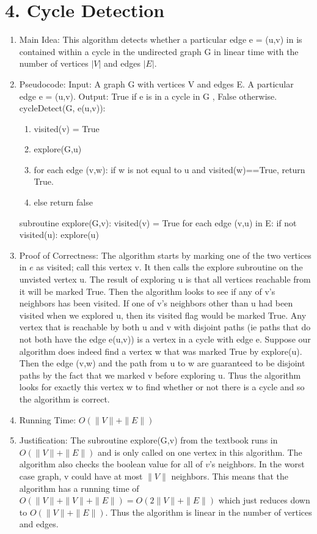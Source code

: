\documentclass[11pt]{article}
\begin{document}
\section*{4. Cycle Detection}
\begin{enumerate}
\item Main Idea: This algorithm detects whether a particular edge e = (u,v) in is contained within a cycle in the undirected graph G in linear time with the number of vertices $|V|$ and edges $|E|$.
\item Pseudocode: \newline
Input: A graph G with vertices V and edges E. A particular edge e = (u,v).\newline
Output: True if e is in a cycle in G , False otherwise.\newline
cycleDetect(G, e(u,v)):
\begin{enumerate}
\item visited(v) = True
\item explore(G,u)
\item for each edge (v,w): if w is not equal to u and visited(w)==True, return True.
\item else return false
\end{enumerate}
subroutine explore(G,v):\newline
\indent visited(v) = True\newline
\indent for each edge (v,u) in E:
\indent\indent if not visited(u): explore(u)
\item Proof of Correctness: The algorithm starts by marking one of the two vertices in $e$ as visited; call this vertex v. It then calls the explore subroutine on the unvisted vertex u. The result of exploring u is that all vertices reachable from it will be marked True. Then the algorithm looks to see if any of v's neighbors has been visited. If one of v's neighbors other than u had been visited when we explored u, then its visited flag would be marked True. Any vertex that is reachable by both u and v with disjoint paths (ie paths that do not both have the edge e(u,v)) is a vertex in a cycle with edge e. Suppose our algorithm does indeed find a vertex w that was marked True by explore(u). Then the edge (v,w) and the path from u to w are guaranteed to be disjoint paths by the fact that we marked v before exploring u. Thus the algorithm looks for exactly this vertex w to find whether or not there is a cycle and so the algorithm is correct.
\item Running Time: $O(\|V\|+\|E\|)$
\item Justification: The subroutine explore(G,v) from the textbook runs in $O(\|V\|+\|E\|)$ and is only called on one vertex in this algorithm. The algorithm also checks the boolean value for all of $v$'s neighbors. In the worst case graph, v could have at most $\|V\|$ neighbors. This means that the algorithm has a running time of $O(\|V\|+\|V\|+\|E\|)=O(2\|V\|+\|E\|)$ which just reduces down to $O(\|V\|+\|E\|)$. Thus the algorithm is linear in the number of vertices and edges.
\end{enumerate}
\end{document}
